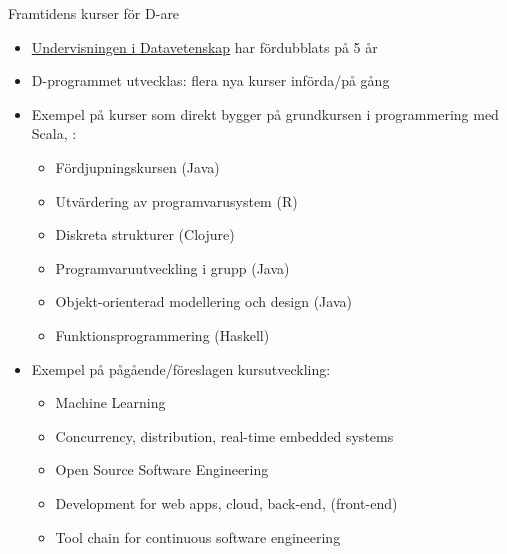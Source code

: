 \begin{Slide}{Framtidens kurser för D-are}
\begin{itemize}
  \item \href{http://cs.lth.se/utbildning/}{Undervisningen i Datavetenskap} har fördubblats på 5 år
  \item D-programmet utvecklas: flera nya kurser införda/på gång
  \item Exempel på kurser som direkt bygger på grundkursen i programmering med Scala, :
\begin{itemize}
\item Fördjupningskursen (Java)
\item {} Utvärdering av programvarusystem (R)
\item {} Diskreta strukturer (Clojure)
\item Programvaruutveckling i grupp (Java)
\item Objekt-orienterad modellering och design (Java)
\item {} Funktionsprogrammering (Haskell)
\end{itemize}
\item Exempel på pågående/föreslagen kursutveckling:
\begin{itemize}
  \item Machine Learning
  \item Concurrency, distribution, real-time embedded systems
  \item Open Source Software Engineering
  \item Development for web apps, cloud, back-end, (front-end)
  \item Tool chain for continuous software engineering
\end{itemize}
\end{itemize}
\end{Slide}


